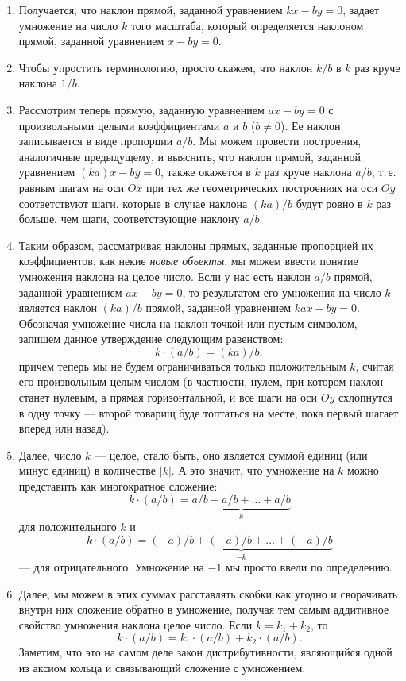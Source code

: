 \begin{enumerate}
\item Получается, что наклон прямой, заданной уравнением $kx-by=0$, задает умножение на число $k$ того масштаба, который определяется наклоном прямой, заданной уравнением $x-by=0$.
\item Чтобы упростить терминологию, просто скажем, что наклон $k/b$ в $k$ раз круче наклона $1/b$.

\item Рассмотрим теперь прямую, заданную уравнением $ax-by=0$ с произвольными целыми коэффициентами $a$ и $b$ ($b\ne 0$). Ее наклон записывается в виде пропорции $a/b$. Мы можем провести построения, аналогичные предыдущему, и выяснить, что наклон прямой, заданной уравнением $(ka)x-by=0$, также окажется в $k$ раз круче наклона $a/b$, т.\,е. равным шагам на оси $Ox$ при тех же геометрических построениях на оси $Oy$ соответствуют шаги, которые в случае наклона $(ka)/b$ будут ровно в $k$ раз больше, чем шаги, соответствующие наклону $a/b$.

\item Таким образом, рассматривая наклоны прямых, заданные пропорцией их коэффициентов, как некие 
\textit{новые объекты}, мы можем ввести понятие умножения наклона на целое число. Если у нас есть наклон $a/b$ прямой, заданной уравнением $ax-by=0$, то результатом его умножения на число $k$ является наклон $(ka)/b$ прямой, заданной уравнением $kax-by=0$. Обозначая умножение числа на наклон точкой или пустым символом, запишем данное утверждение следующим равенством:
$$
k\cdot(a/b) = (ka)/b,
$$
причем теперь мы не будем ограничиваться только положительным $k$, считая его произвольным целым числом (в частности, нулем, при котором наклон станет нулевым, а прямая горизонтальной, и все шаги на оси $Oy$ схлопнутся в одну точку --- второй товарищ буде топтаться на месте, пока первый шагает вперед или назад).
\item Далее, число $k$ --- целое, стало быть, оно является суммой единиц (или минус единиц) в количестве $|k|$. А это значит, что умножение на $k$ можно представить как многократное сложение:
$$
k\cdot(a/b) = \underbrace{a/b + a/b + \dots + a/b}_{k}
$$
для положительного $k$ и
$$
k\cdot(a/b) = \underbrace{(-a)/b + (-a)/b + \dots + (-a)/b}_{-k}
$$
--- для отрицательного. Умножение на $-1$ мы просто ввели по определению.

\item Далее, мы можем в этих суммах расставлять скобки как угодно и сворачивать внутри них сложение обратно в умножение, получая тем самым аддитивное свойство умножения наклона целое число. Если $k=k_1+k_2$, то
$$
k\cdot(a/b) = k_1\cdot(a/b) + k_2\cdot(a/b).
$$
Заметим, что это на самом деле закон дистрибутивности, являющийся одной из аксиом кольца и связывающий сложение с умножением.


\end{enumerate}
